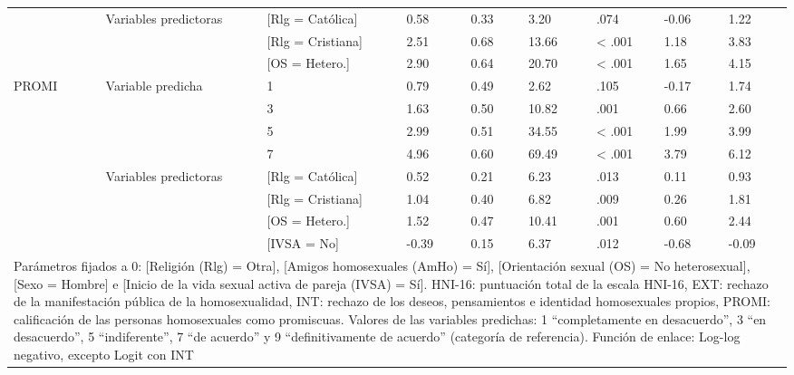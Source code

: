 \documentclass[a4paper,12pt]{article}
\begin{document}
\begin{table}
\begin{tabular}{lllllllll}
& \multirow{3}{*}{Variables predictoras}& [Rlg = Católica]& 0.58& 0.33& 3.20& .074& -0.06& 1.22\\
&&[Rlg = Cristiana]& 2.51& 0.68& 13.66& < .001& 1.18& 3.83\\
&&[OS = Hetero.]& 2.90& 0.64& 20.70& < .001& 1.65& 4.15\\
\multirow{8}{*}{PROMI}&\multirow{4}{*}{Variable predicha}& 1& 0.79& 0.49& 2.62& .105& -0.17& 1.74\\
&&3& 1.63& 0.50& 10.82& .001& 0.66& 2.60\\
&&5& 2.99& 0.51& 34.55& < .001& 1.99& 3.99\\
&&7& 4.96& 0.60& 69.49& < .001& 3.79& 6.12\\
& \multirow{4}{*}{Variables predictoras}& [Rlg = Católica]& 0.52& 0.21& 6.23& .013& 0.11& 0.93\\
&&[Rlg = Cristiana]& 1.04& 0.40& 6.82& .009& 0.26& 1.81\\
&&[OS = Hetero.]& 1.52& 0.47& 10.41& .001& 0.60& 2.44\\
&&[IVSA = No]& -0.39& 0.15& 6.37& .012& -0.68& -0.09\\ \hline
\multicolumn{9}{p{17.8cm}}{Parámetros fijados a 0: [Religión (Rlg) = Otra], [Amigos homosexuales (AmHo) = Sí], [Orientación
sexual (OS) = No heterosexual], [Sexo = Hombre] e [Inicio de la vida sexual activa de pareja (IVSA)
= Sí]. HNI-16: puntuación total de la escala HNI-16, EXT: rechazo de la manifestación pública de la
homosexualidad, INT: rechazo de los deseos, pensamientos e identidad homosexuales propios,
PROMI: calificación de las personas homosexuales como promiscuas. Valores de las variables
predichas: 1 “completamente en desacuerdo”, 3 “en desacuerdo”, 5 “indiferente”, 7 “de acuerdo” y
9 “definitivamente de acuerdo” (categoría de referencia). Función de enlace: Log-log negativo,
excepto Logit con INT}
\end{tabular}
\end{table}
\end{document}
